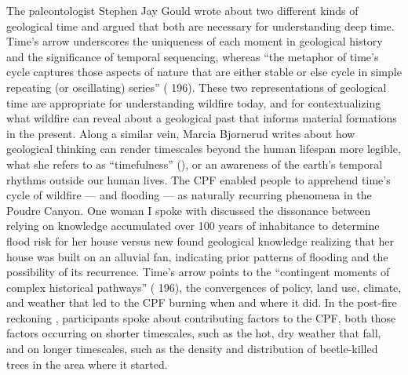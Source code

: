 \documentclass[
]{article}
\begin{document}
The paleontologist Stephen Jay Gould wrote about two different kinds of geological time and argued that both are necessary for understanding deep time. Time's arrow underscores the uniqueness of each moment in geological history and the significance of temporal sequencing, whereas ``the metaphor of time's cycle captures those aspects of nature that are either stable or else cycle in simple repeating (or oscillating) series'' ( 196). These two representations of geological time are appropriate for understanding wildfire today, and for contextualizing what wildfire can reveal about a geological past that informs material formations in the present. Along a similar vein, Marcia Bjornerud writes about how geological thinking can render timescales beyond the human lifespan more legible, what she refers to as ``timefulness'' (), or an awareness of the earth's temporal rhythms outside our human lives. The CPF enabled people to apprehend time's cycle of wildfire --- and flooding --- as naturally recurring phenomena in the Poudre Canyon. One woman I spoke with discussed the dissonance between relying on knowledge accumulated over 100 years of inhabitance to determine flood risk for her house versus new found geological knowledge realizing that her house was built on an alluvial fan, indicating prior patterns of flooding and the possibility of its recurrence. Time's arrow points to the ``contingent moments of complex historical pathways'' ( 196), the convergences of policy, land use, climate, and weather that led to the CPF burning when and where it did. In the post-fire reckoning , participants spoke about contributing factors to the CPF, both those factors occurring on shorter timescales, such as the hot, dry weather that fall, and on longer timescales, such as the density and distribution of beetle-killed trees in the area where it started.
\end{document}
